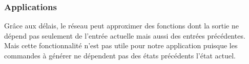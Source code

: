 \subsubsection*{Applications}
Grâce aux délais, le réseau peut approximer des fonctions dont la sortie ne dépend pas seulement de l'entrée actuelle mais aussi des entrées précédentes.
Mais cette fonctionnalité n'est pas utile pour notre application puisque les commandes à générer ne dépendent pas des états précédents l'état actuel.
